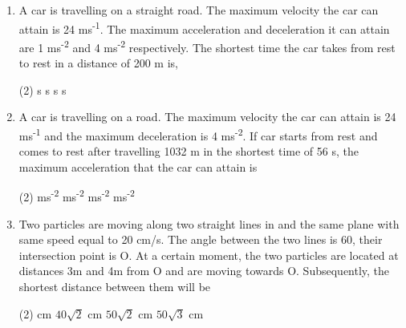 \documentclass{article}
\begin{document}
\begin{enumerate}
    \item A car is travelling on a straight road. The maximum velocity the car can attain is 24 ms\textsuperscript{-1}. The maximum acceleration and deceleration it can attain are 1 ms\textsuperscript{-2} and 4 ms\textsuperscript{-2} respectively. The shortest time the car takes from rest to rest in a distance of 200 m is,
    \begin{tasks}(2)
         s
         s
         s
         s
    \end{tasks}
    
    \item A car is travelling on a road. The maximum velocity the car can attain is 24 ms\textsuperscript{-1} and the maximum deceleration is 4 ms\textsuperscript{-2}. If car starts from rest and comes to rest after travelling 1032 m in the shortest time of 56 s, the maximum acceleration that the car can attain is
    \begin{tasks}(2)
         ms\textsuperscript{-2}
         ms\textsuperscript{-2}
         ms\textsuperscript{-2}
         ms\textsuperscript{-2}
    \end{tasks}

    \item Two particles are moving along two straight lines in and the same plane with same speed equal to 20 cm/s. The angle between the two lines is 60\textdegree{}, their intersection point is O. At a certain moment, the two particles are located at distances 3m and 4m from O and are moving towards O. Subsequently, the shortest distance between them will be
    \begin{tasks}(2)
         cm
        \task $40\sqrt{2}$ cm
        \task $50\sqrt{2}$ cm
        \task $50\sqrt{3}$ cm
    \end{tasks}
\end{enumerate}
\end{document}
